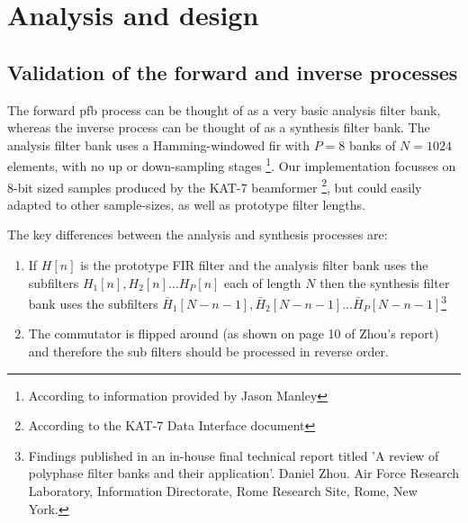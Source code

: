 \documentclass[a4paper,10pt]{article}
\begin{document}
\section{Analysis and design}
\subsection{Validation of the forward and inverse processes}
The forward \gls{pfb} process can be thought of as a very basic analysis filter bank, whereas the inverse process can be thought of as a synthesis filter bank. The 
analysis filter bank uses a Hamming-windowed \gls{fir} with $P=8$ banks of $N=1024$ elements, with no up or down-sampling stages \footnote{According to information provided by Jason Manley}.
Our implementation focusses on 8-bit sized samples produced by the KAT-7 beamformer \footnote{According to the KAT-7 Data Interface document}, but could easily adapted to other sample-sizes,
as well as prototype filter lengths.

The key differences between the analysis and synthesis processes are:
\begin{enumerate}
 \item If $H[n]$ is the prototype FIR filter and the analysis filter bank uses the subfilters $H_1[n], H_2[n] \dots H_P[n]$ each of length $N$ then the synthesis filter bank
 uses the subfilters $\bar H_1[N-n-1], \bar H_2[N-n-1] \dots \bar H_P[N-n-1]$\footnote{Findings published in an in-house final technical report titled 'A review of polyphase filter 
 banks and their application'. Daniel Zhou. Air Force Research Laboratory, Information Directorate, Rome Research Site, Rome, New York.}
 \item The commutator is flipped around (as shown on page 10 of Zhou's report) and therefore the sub filters should be processed in reverse order.
\end{enumerate}
\end{document}
